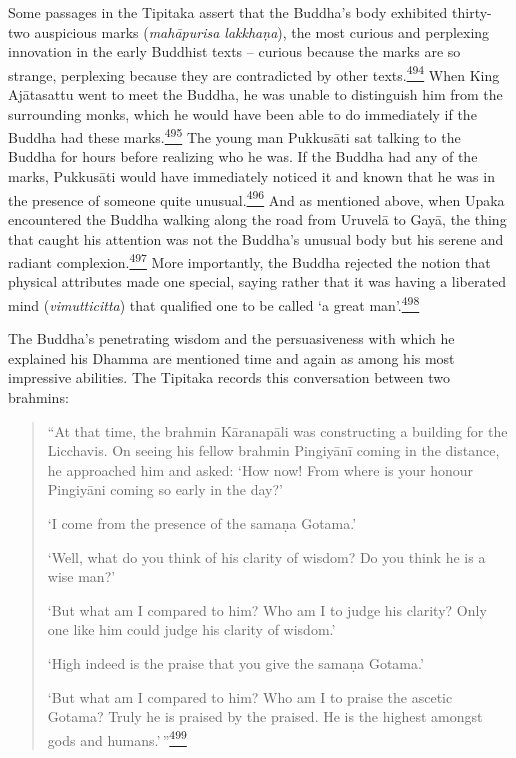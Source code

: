 Some passages in the Tipitaka assert that the Buddha's body exhibited
thirty-two auspicious marks (\emph{mahāpurisa lakkhaṇa}), the most
curious and perplexing innovation in the early Buddhist texts -- curious
because the marks are so strange, perplexing because they are
contradicted by other
texts.\label{footprints_split_013.html_fnref494}\hyperref[footprints_split_025.htmlux5cux23fn494]{\textsuperscript{494}}
When King Ajātasattu went to meet the Buddha, he was unable to
distinguish him from the surrounding monks, which he would have been
able to do immediately if the Buddha had these
marks.\label{footprints_split_013.html_fnref495}\hyperref[footprints_split_025.htmlux5cux23fn495]{\textsuperscript{495}}
The young man Pukkusāti sat talking to the Buddha for hours before
realizing who he was. If the Buddha had any of the marks, Pukkusāti
would have immediately noticed it and known that he was in the presence
of someone quite
unusual.\label{footprints_split_013.html_fnref496}\hyperref[footprints_split_025.htmlux5cux23fn496]{\textsuperscript{496}}
And as mentioned above, when Upaka encountered the Buddha walking along
the road from Uruvelā to Gayā, the thing that caught his attention was
not the Buddha's unusual body but his serene and radiant
complexion.\label{footprints_split_013.html_fnref497}\hyperref[footprints_split_025.htmlux5cux23fn497]{\textsuperscript{497}}
More importantly, the Buddha rejected the notion that physical
attributes made one special, saying rather that it was having a
liberated mind (\emph{vimutticitta}) that qualified one to be called `a
great
man'.\label{footprints_split_013.html_fnref498}\hyperref[footprints_split_025.htmlux5cux23fn498]{\textsuperscript{498}}

The Buddha's penetrating wisdom and the persuasiveness with which he
explained his Dhamma are mentioned time and again as among his most
impressive abilities. The Tipitaka records this conversation between two
brahmins:

\begin{quote}
``At that time, the brahmin Kāranapāli was constructing a building for
the Licchavis. On seeing his fellow brahmin Pingiyānī coming in the
distance, he approached him and asked: `How now! From where is your
honour Pingiyāni coming so early in the day?'

`I come from the presence of the samaṇa Gotama.'

`Well, what do you think of his clarity of wisdom? Do you think he is a
wise man?'

`But what am I compared to him? Who am I to judge his clarity? Only one
like him could judge his clarity of wisdom.'

`High indeed is the praise that you give the samaṇa Gotama.'

`But what am I compared to him? Who am I to praise the ascetic Gotama?
Truly he is praised by the praised. He is the highest amongst gods and
humans.'\,''\label{footprints_split_013.html_fnref499}\hyperref[footprints_split_025.htmlux5cux23fn499]{\textsuperscript{499}}
\end{quote}

